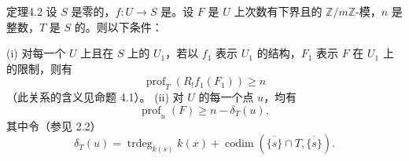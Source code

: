 \begin{SGAresult}{定理}{4.2}
设 $S$ 是零的，$f:U\to S$ 是。设 $F$ 是 $U$ 上次数有下界且的 $\mathbb Z/m\mathbb Z$-模，$n$ 是整数，$T$ 是 $S$ 的。则以下条件：

(i) 对每一个 $U$ 上且在 $S$ 上的 $U_1$，若以 $f_1$ 表示 $U_1$ 的结构，$F_1$ 表示 $F$ 在 $U_1$ 上的限制，则有
\[
\operatorname{prof}_T(R_!f_1(F_1))\geq n
\]
（此关系的含义见命题 4.1）。
(ii) 对 $U$ 的每一个点 $u$，均有
\[
\operatorname{prof}_u(F)\geq n-\delta_T(u),
\]
其中令（参见 2.2）
\[
\delta_T(u)=\operatorname{trdeg}_{k(s)}k(x)+
\operatorname{codim}(\overline{\{s\}}\cap T,\overline{\{s\}}).
\]
\end{SGAresult}
